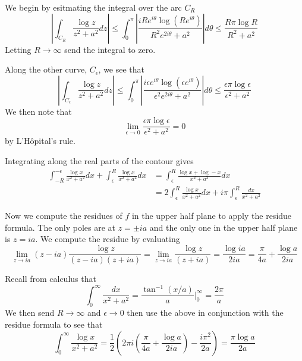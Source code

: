 \documentclass{article}
\begin{document}
We begin by esitmating the integral over the arc $C_R$
\[
\left|\int_{C_R}\frac{\log z}{z^2+a^2}dz\right| \leq \int_0^\pi
\left|\frac{iRe^{i\theta}\log (Re^{i\theta})}{R^2e^{2i\theta} +
    a^2}\right|d\theta \leq \frac{R\pi\log R}{R^2 + a^2}
\]
Letting $R \to \infty$ send the integral to zero.

Along the other curve, $C_\epsilon$, we see that
\[
\left|\int_{C_\epsilon}\frac{\log z}{z^2+a^2}dz\right| \leq \int_0^\pi
\left|\frac{i\epsilon e^{i\theta}\log (\epsilon
    e^{i\theta})}{\epsilon^2e^{2i\theta} + a^2}\right|d\theta \leq
\frac{\epsilon\pi\log \epsilon}{\epsilon^2 + a^2}
\]
We then note that
\[
\lim_{\epsilon \to 0} \frac{\epsilon\pi\log\epsilon}{\epsilon^2 + a^2} = 0
\]
by L'H\^{o}pital's rule.

Integrating along the real parts of the contour gives
\begin{align*}
  \int_{-R}^{-\epsilon} \frac{\log x}{x^2 + a^2}dx + \int_\epsilon^R
  \frac{\log x}{x^2 + a^2}dx &= \int_\epsilon^R\frac{\log x +\log
    -x}{x^2
    + a^2}dx \\
  &= 2\int_\epsilon^R \frac{\log x}{x^2 + a^2}dx + i\pi\int_\epsilon^R
  \frac{dx}{x^2 + a^2}
\end{align*}

Now we compute the residues of $f$ in the upper half plane to apply
the residue formula. The only poles are at $z = \pm ia$ and the only
one in the upper half plane is $z = ia$. We compute the residue by
evaluating
\[
\lim_{z \to ia}(z-ia)\frac{\log z}{(z-ia)(z+ia)} = \lim_{z \to
  ia}\frac{\log z}{(z+ia)} = \frac{\log ia}{2ia} = \frac{\pi}{4a} +
\frac{\log a}{2ia}
\]

Recall from calculus that
\[
\int_0^\infty \frac{dx}{x^2+a^2} =
\frac{\tan^{-1}(x/a)}{a}\Bigg|_0^\infty = \frac{2\pi}{a}
\]
We then send $R\to\infty$ and $\epsilon \to 0$ then use the above in
conjunction with the residue formula to see that
\[
\int_0^\infty \frac{\log x}{x^2+a^2} = \frac{1}{2}\left(2\pi
  i\left(\frac{\pi}{4a} + \frac{\log a}{2ia}\right) -
  \frac{i\pi^2}{2a}\right) = \frac{\pi\log a}{2a}
\]
\end{document}
